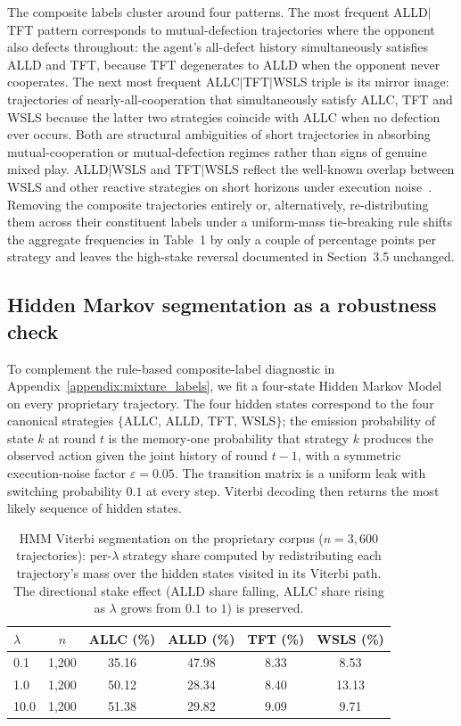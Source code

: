 \documentclass[a4paper,fleqn]{cas-sc}
\begin{document}
The composite labels cluster around four patterns. The most frequent ALLD$|$TFT pattern corresponds to mutual-defection trajectories where the opponent also defects throughout: the agent's all-defect history simultaneously satisfies ALLD and TFT, because TFT degenerates to ALLD when the opponent never cooperates. The next most frequent ALLC$|$TFT$|$WSLS triple is its mirror image: trajectories of nearly-all-cooperation that simultaneously satisfy ALLC, TFT and WSLS because the latter two strategies coincide with ALLC when no defection ever occurs. Both are structural ambiguities of short trajectories in absorbing mutual-cooperation or mutual-defection regimes rather than signs of genuine mixed play. ALLD$|$WSLS and TFT$|$WSLS reflect the well-known overlap between WSLS and other reactive strategies on short horizons under execution noise~\cite{diStefanoIntention2023,inferenceStrategies,Han2012ALIFEjournal}. Removing the composite trajectories entirely or, alternatively, re-distributing them across their constituent labels under a uniform-mass tie-breaking rule shifts the aggregate frequencies in Table~1 by only a couple of percentage points per strategy and leaves the high-stake reversal documented in Section~3.5 unchanged.

\subsection{Hidden Markov segmentation as a robustness check}\label{appendix:hmm_segmentation}

To complement the rule-based composite-label diagnostic in Appendix~\ref{appendix:mixture_labels}, we fit a four-state Hidden Markov Model on every proprietary trajectory. The four hidden states correspond to the four canonical strategies $\{$ALLC, ALLD, TFT, WSLS$\}$; the emission probability of state $k$ at round $t$ is the memory-one probability that strategy $k$ produces the observed action given the joint history of round $t{-}1$, with a symmetric execution-noise factor $\varepsilon{=}0.05$. The transition matrix is a uniform leak with switching probability $0.1$ at every step. Viterbi decoding then returns the most likely sequence of hidden states.

\begin{table}[pos=H]
\centering
\caption{HMM Viterbi segmentation on the proprietary corpus ($n = 3{,}600$ trajectories): per-$\lambda$ strategy share computed by redistributing each trajectory's mass over the hidden states visited in its Viterbi path. The directional stake effect (ALLD share falling, ALLC share rising as $\lambda$ grows from $0.1$ to $1$) is preserved.}
\label{tab:hmm_per_lambda}
\footnotesize
\begin{tabular}{lccccc}
\toprule
$\lambda$ & $n$ & ALLC (\%) & ALLD (\%) & TFT (\%) & WSLS (\%) \\
\midrule
0.1  & 1{,}200 & 35.16 & 47.98 & 8.33 & 8.53 \\
1.0  & 1{,}200 & 50.12 & 28.34 & 8.40 & 13.13 \\
10.0 & 1{,}200 & 51.38 & 29.82 & 9.09 & 9.71 \\
\bottomrule
\end{tabular}
\end{table}
\end{document}

